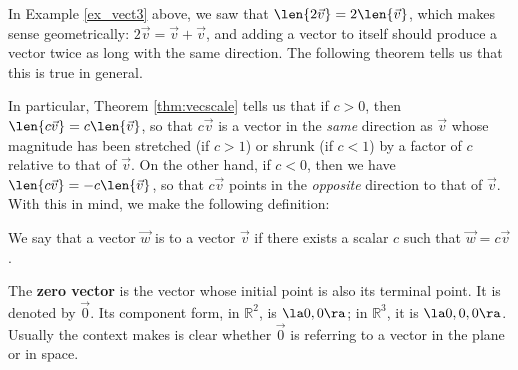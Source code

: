 \pagebreak

In Example \ref{ex_vect3} above, we saw that $\len{2\vec v} = 2\len{\vec v}$, which makes sense geometrically: $2\vec v = \vec v+\vec v$, and adding a vector to itself should produce a vector twice as long with the same direction. The following theorem tells us that this is true in general.


In particular, Theorem \ref{thm:vecscale} tells us that if $c>0$, then $\len{c\vec{v}}=c\len{\vec{v}}$, so that $c\vec{v}$ is a vector in the \textit{same} direction as $\vec{v}$ whose magnitude has been stretched (if $c>1$) or shrunk (if $c<1$) by a factor of $c$ relative to that of $\vec{v}$. On the other hand, if $c<0$, then we have $\len{c\vec{v}}=-c\len{\vec{v}}$, so that $c\vec{v}$ points in the \textit{opposite} direction to that of $\vec{v}$. With this in mind, we make the following definition:

{We say that a vector $\vec{w}$ is   to a vector $\vec{v}$ if there exists a scalar $c$ such that $\vec{w}=c\vec{v}$.}


The \textbf{zero vector} is the vector whose initial point is also its terminal point. It is denoted by $\vec 0$. Its component form, in $\mathbb{R}^2$, is $\la 0,0\ra$; in $\mathbb{R}^3$, it is $\la 0,0,0\ra$. Usually the context makes is clear whether $\vec 0$ is referring to a vector in the plane or in space. 

